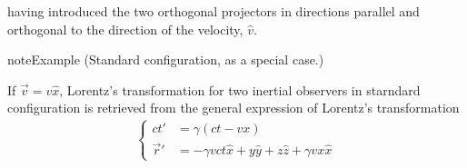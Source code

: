 \documentclass[letterpaper,10pt,english]{jupyterBook}
\begin{document}
\sphinxAtStartPar
having introduced the two orthogonal projectors in directions parallel and orthogonal to the direction of the velocity, \(\hat{v}\).
\label{None:example-0}
\begin{sphinxadmonition}{note}{Example  (Standard configuration, as a special case.)}



\sphinxAtStartPar
If \(\vec{v} = v \hat{x}\), Lorentz’s transformation for two inertial observers in starndard configuration is retrieved from the general expression of Lorentz’s transformation
\begin{equation*}
\begin{split}\begin{cases}
  c t' & = \gamma(ct - v x) \\
  \vec{r}' & = -\gamma v ct \hat{x} + y \hat{y} + z \hat{z} + \gamma v x \hat{x}
\end{cases}\end{split}
\end{equation*}\end{sphinxadmonition}
\end{document}
